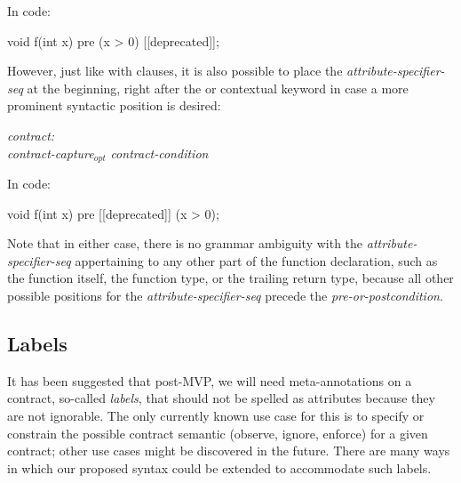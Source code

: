 In code:

\begin{codeblock}
void f(int x)
  pre (x > 0) [[deprecated]];
\end{codeblock}

However, just like with  clauses, it is also possible to place the \emph{attribute-specifier-seq} at the beginning, right after the  or  contextual keyword in case a more prominent syntactic position is desired:

\begin{adjustwidth}{0.5cm}{0.5cm}

\emph{contract:} \\
\phantom{~~~} \emph{contract-capture}$_{opt}$ \emph{contract-condition} 

\end{adjustwidth}

In code:

\begin{codeblock}
void f(int x)
  pre [[deprecated]] (x > 0);
\end{codeblock}

Note that in either case, there is no grammar ambiguity with the \emph{attribute-specifier-seq} appertaining to any other part of the function declaration, such as the function itself, the function type, or the trailing return type, because all other possible positions for the \emph{attribute-specifier-seq} precede the \emph{pre-or-postcondition}.


\subsection{Labels}
\label{subsec:labels}

It has been suggested that post-MVP, we will need meta-annotations on a contract, so-called \emph{labels}, that should not be spelled as attributes because they are not ignorable. The only currently known use case for this is to specify or constrain the possible contract semantic (observe, ignore, enforce) for a given contract; other use cases might be discovered in the future. There are many ways in which our proposed syntax could be extended to accommodate such labels.

